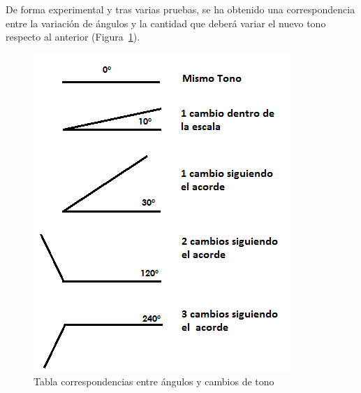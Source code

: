 De forma experimental y tras varias pruebas, se ha obtenido una correspondencia entre la variación de ángulos y la cantidad que deberá variar el nuevo tono respecto al anterior (Figura~\ref{fig:Figura3Voz1}). 

		\begin{figure}[htbp]
		\centering
		\hspace*{0.0in}
		\includegraphics[scale=0.75]{graphics/tabla-corresp-Tono-Angulo.png}
		\caption{Tabla correspondencias entre ángulos y cambios de tono}
		\label{fig:Figura3Voz1}
		\end{figure}

